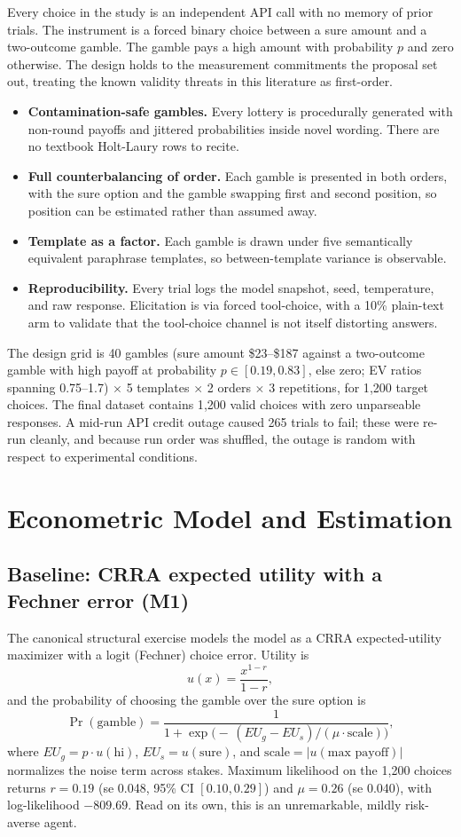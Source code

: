 \documentclass[11pt]{article}
\begin{document}
Every choice in the study is an independent API call with no memory of prior trials. The instrument
is a forced binary choice between a sure amount and a two-outcome gamble. The gamble pays a high
amount with probability $p$ and zero otherwise. The design holds to the measurement commitments the
proposal set out, treating the known validity threats in this literature as first-order.

\begin{itemize}
  \item \textbf{Contamination-safe gambles.} Every lottery is procedurally generated with non-round
  payoffs and jittered probabilities inside novel wording. There are no textbook Holt-Laury rows to
  recite.
  \item \textbf{Full counterbalancing of order.} Each gamble is presented in both orders, with the
  sure option and the gamble swapping first and second position, so position can be estimated rather
  than assumed away.
  \item \textbf{Template as a factor.} Each gamble is drawn under five semantically equivalent
  paraphrase templates, so between-template variance is observable.
  \item \textbf{Reproducibility.} Every trial logs the model snapshot, seed, temperature, and raw
  response. Elicitation is via forced tool-choice, with a 10\% plain-text arm to validate that the
  tool-choice channel is not itself distorting answers.
\end{itemize}

The design grid is 40 gambles (sure amount \$23--\$187 against a two-outcome gamble with high payoff
at probability $p \in [0.19, 0.83]$, else zero; EV ratios spanning 0.75--1.7) $\times$ 5 templates
$\times$ 2 orders $\times$ 3 repetitions, for 1{,}200 target choices. The final dataset contains
1{,}200 valid choices with zero unparseable responses. A mid-run API credit outage caused 265 trials
to fail; these were re-run cleanly, and because run order was shuffled, the outage is random with
respect to experimental conditions.

\section{Econometric Model and Estimation}

\subsection{Baseline: CRRA expected utility with a Fechner error (M1)}
The canonical structural exercise models the model as a CRRA expected-utility maximizer with a logit
(Fechner) choice error. Utility is
\[
  u(x) = \frac{x^{1-r}}{1-r},
\]
and the probability of choosing the gamble over the sure option is
\[
  \Pr(\text{gamble}) = \frac{1}{1 + \exp\!\big(-\,(EU_g - EU_s)/(\mu \cdot \text{scale})\big)},
\]
where $EU_g = p \cdot u(\text{hi})$, $EU_s = u(\text{sure})$, and $\text{scale} = |u(\text{max
payoff})|$ normalizes the noise term across stakes. Maximum likelihood on the 1{,}200 choices
returns $r = 0.19$ (se 0.048, 95\% CI $[0.10, 0.29]$) and $\mu = 0.26$ (se 0.040), with log-likelihood
$-809.69$. Read on its own, this is an unremarkable, mildly risk-averse agent.
\end{document}
